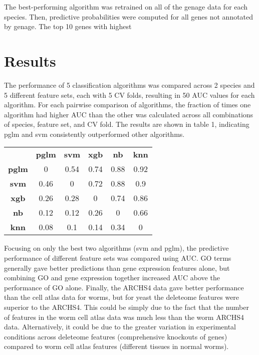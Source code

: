 \documentclass{article}
\begin{document}
The best-performing algorithm was retrained on all of the genage data for each species. Then, predictive probabilities were computed for all genes not annotated by genage. The top 10 genes with highest

\section{Results}

The performance of 5 classification algorithms was compared across 2 species and 5 different feature sets, each with 5 CV folds, resulting in 50 AUC values for each algorithm. For each pairwise comparison of algorithms, the fraction of times one algorithm had higher AUC than the other was calculated across all combinations of species, feature set, and CV fold. The results are shown in table 1, indicating pglm and svm consistently outperformed other algorithms.

\begin{table}[ht]
\begin{tabular}{cccccc}
             & \textbf{pglm} & \textbf{svm} & \textbf{xgb} & \textbf{nb} & \textbf{knn} \\
\textbf{pglm} & 0             & 0.54         & 0.74         & 0.88        & 0.92         \\
\textbf{svm}  & 0.46          & 0            & 0.72         & 0.88        & 0.9          \\
\textbf{xgb}  & 0.26          & 0.28         & 0            & 0.74        & 0.86         \\
\textbf{nb}   & 0.12          & 0.12         & 0.26         & 0           & 0.66         \\
\textbf{knn}  & 0.08          & 0.1          & 0.14         & 0.34        & 0
\end{tabular}
\end{table}

Focusing on only the best two algorithms (svm and pglm), the predictive performance of different feature sets was compared using AUC. GO terms generally gave better predictions than gene expression features alone, but combining GO and gene expression together increased AUC above the performance of GO alone. Finally, the ARCHS4 data gave better performance than the cell atlas data for worms, but for yeast the deleteome features were superior to the ARCHS4. This could be simply due to the fact that the number of features in the worm cell atlas data was much less than the worm ARCHS4 data. Alternatively, it could be due to the greater variation in experimental conditions across deleteome features (comprehensive knockouts of genes) compared to worm cell atlas features (different tissues in normal worms).
\end{document}
